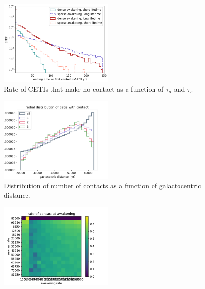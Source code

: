 \documentclass[crop]{CSLB}%
\begin{document}
\begin{figure} %
   \centering
   \includegraphics[width=0.5\textwidth]{Figure_2.png}
   \caption{Rate of CETIs that make no contact as a function of
   $\tau_a$ and $\tau_s$}
   \label{F_res_2}
\end{figure}
 
\begin{figure}
   \centering
   \includegraphics[width=0.5\textwidth]{Figure_3.png}
   \caption{Distribution of number of contacts as a function of
   galactocentric distance.}
   \label{F_res_5}
\end{figure}
 




  
\begin{figure} %
   \centering
   \includegraphics[width=0.5\textwidth]{Figure_4.png}
   \caption{}
   \label{F_res_4}
\end{figure}
 
\end{document}
